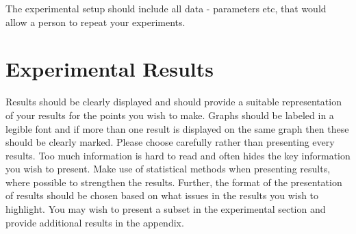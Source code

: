   The experimental setup should include all data - parameters etc, that would allow a person to repeat your experiments.

  \section{Experimental Results}
  \label{sec:experimentalResults}

  Results should be clearly displayed and should provide a suitable representation of your results for the points you wish to make. Graphs should be labeled in a legible font and if more than one result is displayed on the same graph then these should be clearly marked.   Please choose carefully rather than presenting every results. Too much information is hard to read and often hides the key information you wish to present. Make use of statistical methods when presenting results, where possible to strengthen the results.  Further, the format of the presentation of results should be chosen based on what issues in the results you wish to highlight. You may wish to present a subset in the experimental section and provide additional results in the appendix.
\fi